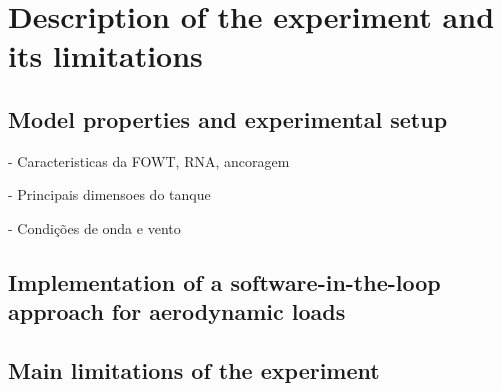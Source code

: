 \section{Description of the experiment and its limitations} \label{sec:experimental_setup}

\subsection{Model properties and experimental setup}
- Caracteristicas da FOWT, RNA, ancoragem

- Principais dimensoes do tanque

- Condições de onda e vento

\subsection{Implementation of a software-in-the-loop approach for aerodynamic loads}

\subsection{Main limitations of the experiment}
